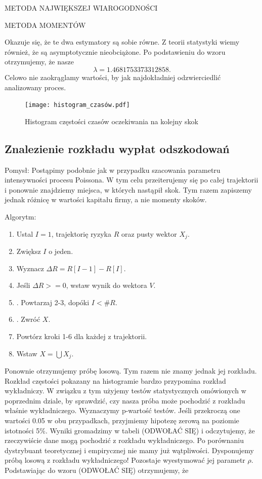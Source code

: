 \documentclass{article}
\theoremstyle{break}
\numberwithin{equation}{subsection}
\numberwithin{figure}{section}
\begin{document}
METODA NAJWIĘKSZEJ WIAROGODNOŚCI

METODA MOMENTÓW

Okazuje się, że te dwa estymatory są sobie równe. Z teorii statystyki wiemy również, że są asymptotycznie nieobciążone. Po podstawieniu do wzoru otrzymujemy, że nasze $$\lambda = 1.4681753373312858.$$ Celowo nie zaokrąglamy wartości, by jak najdokładniej odzwierciedlić analizowany proces.

\begin{figure}[H]
	\center
	\texttt{[image: histogram\_czasów.pdf]}
	\caption{Histogram częstości czasów oczekiwania na kolejny skok}
	\label{fig: 4}
\end{figure}

\subsection{Znalezienie rozkładu wypłat odszkodowań}

Pomysł: Postąpimy podobnie jak w przypadku szacowania parametru intensywności procesu Poissona. W tym celu przeiterujemy się po całej trajektorii i ponownie znajdziemy miejsca, w których nastąpił skok.  Tym razem zapiszemy jednak różnicę w wartości kapitału firmy, a nie momenty skoków.

Algorytm:

\begin{enumerate}
\item Ustal $I = 1$, trajektorię ryzyka $R$ oraz pusty wektor $X_j.$
\item Zwiększ $I$ o jeden.
\item Wyznacz $\Delta R = R[I-1] - R[I]$.
\item Jeśli $\Delta R >= 0$, wstaw wynik do wektora $V$.
\item. Powtarzaj 2-3, dopóki $I < \#R$.
\item. Zwróć $X.$
\item Powtórz kroki 1-6 dla każdej z trajektorii.
\item Wstaw $X = \bigcup X_j$.
\end{enumerate}

Ponownie otrzymujemy próbę losową. Tym razem nie znamy jednak jej rozkładu. Rozkład częstości pokazany na histogramie bardzo przypomina rozkład wykładniczy. W związku z tym użyjemy testów statystycznych omówionych w poprzednim dziale, by sprawdzić, czy nasza próba może pochodzić z rozkładu właśnie wykładniczego.  Wyznaczymy p-wartość testów. Jeśli przekroczą one wartości 0.05 w obu przypadkach, przyjmiemy hipotezę zerową na poziomie istotności 5\%. Wyniki gromadzimy w tabeli (ODWOŁAĆ SIĘ) i odczytujemy, że rzeczywiście dane mogą pochodzić z rozkładu wykładniczego. Po porównaniu dystrybuant teoretycznej i empirycznej nie mamy już wątpliwości. Dysponujemy próbą losową z rozkładu wykładniczego!
Pozostaje wyestymować jej parametr $\rho$. Podstawiając do wzoru (ODWOŁAĆ SIĘ) otrzymujemy, że
\end{document}
